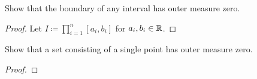 \begin{problem}
Show that the boundary of any interval has outer measure zero.
\end{problem}
\begin{proof}
Let $I\coloneqq\prod_{i=1}^n [a_i,b_i]$ for $a_i,b_i\in\mathbb{R}$.
\end{proof}
\newpage

\begin{problem}
Show that a set consisting of a single point has outer measure zero.
\end{problem}
\begin{proof}
\end{proof}

